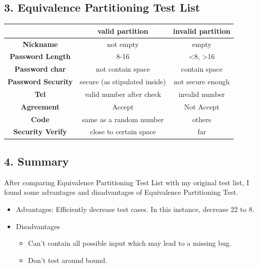 \documentclass[11pt, oneside]{article}  %
\begin{document}
\subsection*{3. Equivalence Partitioning Test List}

\begin{table}[H]
    \begin{tabular}{|c|c|c|}
        \hline
                                & \textbf{valid partition}      & \textbf{invalid partition}     \\ \hline
        \textbf{Nickname}          & not empty                     & empty                          \\ \hline
        \textbf{Password Length}   & 8-16                          & \textless{}8, \textgreater{}16 \\ \hline
        \textbf{Password char}     & not contain space             & contain space                  \\ \hline
        \textbf{Password Security} & secure (as stipulated inside) & not secure enough              \\ \hline
        \textbf{Tel}               & valid number after check      & invalid number                 \\ \hline
        \textbf{Agreement}         & Accept                        & Not Accept                     \\ \hline
        \textbf{Code}              & same as a random number       & others                         \\ \hline
        \textbf{Security Verify}   & close to certain space        & far                            \\ \hline
    \end{tabular}
\end{table}

\subsection*{4. Summary}
After comparing Equivalence Partitioning Test List with my original test list, 
I found some advantages and disadvantages of Equivalence Partitioning Test. 

\begin{itemize}
    \item Advantages: Efficiently decrease test cases. In this instance, decrease 22 to 8. 
    \item Disadvantages
    \begin{itemize}
        \item Can't contain all possible input which may lead to a missing bug. 
        \item Don't test around bound. 
    \end{itemize}
\end{itemize}
\end{document}
